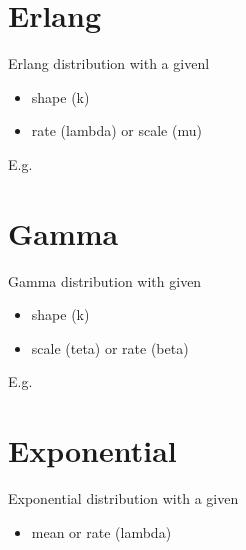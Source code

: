 \documentclass[letterpaper,10pt,english]{sphinxmanual}
\begin{document}
\section{Erlang}
\label{\detokenize{Distributions:erlang}}
Erlang distribution with a givenl
\begin{itemize}
\item {} 
shape (k)

\item {} 
rate (lambda) or scale (mu)

\end{itemize}

E.g.

\begin{sphinxVerbatim}[commandchars=\\\{\}]
     
\end{sphinxVerbatim}


\section{Gamma}
\label{\detokenize{Distributions:gamma}}
Gamma distribution with given
\begin{itemize}
\item {} 
shape (k)

\item {} 
scale (teta) or rate (beta)

\end{itemize}

E.g.

\begin{sphinxVerbatim}[commandchars=\\\{\}]
    
\end{sphinxVerbatim}


\section{Exponential}
\label{\detokenize{Distributions:exponential}}
Exponential distribution with a given
\begin{itemize}
\item {} 
mean or rate (lambda)

\end{itemize}
\end{document}
